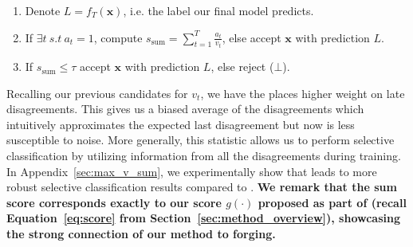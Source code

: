 
\begin{enumerate}
     \item Denote $L = f_T(\bm{x})$, i.e. the label our final model predicts.
     \item If $\exists t~s.t~a_t =1$, compute $s_\text{sum} = \sum_{t=1}^T \frac{a_t}{v_t} $, else accept $\bm{x}$ with prediction $L$. 
     \item If $s_\text{sum} \leq \tau$ accept $\bm{x}$ with prediction $L$, else reject ($\bot$).
\end{enumerate}

Recalling our previous candidates for $v_t$, we have the \ssum places higher weight on late disagreements. This gives us a biased average of the disagreements which intuitively approximates the expected last disagreement but now is less susceptible to noise. More generally, this statistic allows us to perform selective classification by utilizing information from all the disagreements during training. In Appendix~\ref{sec:max_v_sum}, we experimentally show that \ssum leads to more robust selective classification results compared to \smax. \textbf{We remark that the sum score \ssum corresponds exactly to our score $g(\cdot)$ proposed as part of \sptd (recall Equation~\ref{eq:score} from Section~\ref{sec:method_overview}), showcasing the strong connection of our method to forging.}


